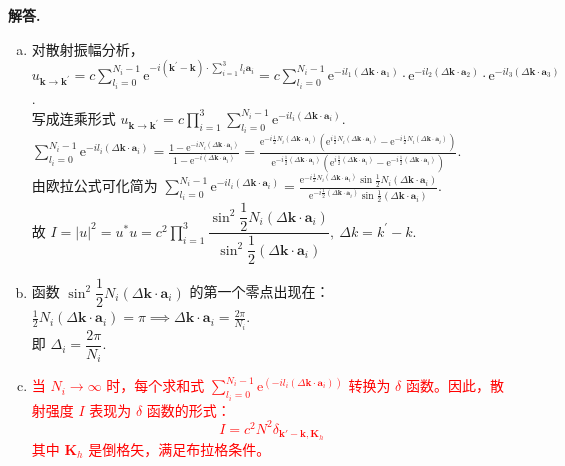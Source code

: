 \documentclass[11pt]{ctexart}
\newenvironment{solution}{\par\noindent\textbf{解答. }}{\par}
\begin{document}
\begin{solution}
    \begin{enumerate}[(a)]
        \item 对散射振幅分析，$\displaystyle u_{\mathbf{k}\to \mathbf{k}^\prime} = c\sum_{l_i = 0}^{N_i - 1}\text{e}^{-i\left(\mathbf{k}^\prime - \mathbf{k}\right)\cdot\sum\limits_{i = 1}^{3}l_i\mathbf{a}_i} 
              = c\sum_{l_i = 0}^{N_i - 1}\text{e}^{-il_1\left(\Delta\mathbf{k}\cdot\mathbf{a}_1\right)}\cdot\text{e}^{-il_2\left(\Delta\mathbf{k}\cdot\mathbf{a}_2\right)}\cdot\text{e}^{-il_3\left(\Delta\mathbf{k}\cdot\mathbf{a}_3\right)}$. \\[12pt]
              写成连乘形式 $\displaystyle u_{\mathbf{k}\to \mathbf{k}^\prime} = c\prod_{i = 1}^{3}\sum_{l_i = 0}^{N_i - 1}\text{e}^{-il_i\left(\Delta\mathbf{k}\cdot\mathbf{a}_i\right)}$. \\[12pt]
              $\displaystyle \sum_{l_i = 0}^{N_i - 1}\text{e}^{-il_i\left(\Delta\mathbf{k}\cdot\mathbf{a}_i\right)} = \frac{1 - \text{e}^{-i N_i \left(\Delta\mathbf{k} \cdot \mathbf{a}_i\right)}}{1 - \text{e}^{-i\left(\Delta\mathbf{k}\cdot\mathbf{a}_i\right)}}
              = \frac{\text{e}^{-i\frac{1}{2}N_i \left(\Delta\mathbf{k} \cdot \mathbf{a}_i\right)}\left(\text{e}^{i\frac{1}{2}N_i \left(\Delta\mathbf{k} \cdot \mathbf{a}_i\right)} - \text{e}^{-i\frac{1}{2}N_i \left(\Delta\mathbf{k} \cdot \mathbf{a}_i\right)}\right)}{\text{e}^{-i\frac{1}{2}\left(\Delta\mathbf{k} \cdot \mathbf{a}_i\right)}\left(\text{e}^{i\frac{1}{2}\left(\Delta\mathbf{k} \cdot \mathbf{a}_i\right)} - \text{e}^{-i\frac{1}{2}\left(\Delta\mathbf{k} \cdot \mathbf{a}_i\right)}\right)}$. \\[12pt]
              由欧拉公式可化简为 $\displaystyle \sum_{l_i = 0}^{N_i - 1}\text{e}^{-il_i\left(\Delta\mathbf{k}\cdot\mathbf{a}_i\right)} = \frac{\text{e}^{-i\frac{1}{2}N_i \left(\Delta\mathbf{k} \cdot \mathbf{a}_i\right)}\sin{\frac{1}{2}N_i \left(\Delta\mathbf{k} \cdot \mathbf{a}_i\right)}}{\text{e}^{-i\frac{1}{2} \left(\Delta\mathbf{k} \cdot \mathbf{a}_i\right)}\sin{\frac{1}{2} \left(\Delta\mathbf{k} \cdot \mathbf{a}_i\right)}}$. \\[12pt]
              故 $\displaystyle I = \left|u\right|^2 = u^*u = c^2\prod_{i = 1}^{3}\dfrac{\sin^2{\dfrac{1}{2}N_i\left(\Delta\mathbf{k}\cdot\mathbf{a}_i\right)}}{\sin^2{\dfrac{1}{2}\left(\Delta\mathbf{k}\cdot\mathbf{a}_i\right)}},\ \Delta k = k^\prime - k$.
        \item 函数 $\sin^2{\dfrac{1}{2}N_i\left(\Delta\mathbf{k}\cdot\mathbf{a}_i\right)}$ 的第一个零点出现在：$\displaystyle\frac{1}{2} N_i (\Delta \mathbf{k} \cdot \mathbf{a}_i) = \pi \implies \Delta \mathbf{k} \cdot \mathbf{a}_i = \frac{2\pi}{N_i}$. \\[12pt]
              即 $\Delta_i = \dfrac{2\pi}{N_i}$.
        \item \textcolor{red}{当 $N_i\to\infty$ 时，每个求和式 $\displaystyle\sum_{l_i=0}^{N_i-1}\text{e}^{\left(-i l_i(\Delta\mathbf{k}\cdot\mathbf{a}_i)\right)} $ 转换为 $\delta$ 函数。因此，散射强度 $I$ 表现为 $\delta$ 函数的形式：
              $$I = c^2 N^2 \delta_{\mathbf{k}' - \mathbf{k}, \mathbf{K}_h}$$
              其中 $\mathbf{K}_h$ 是倒格矢，满足布拉格条件。}
    \end{enumerate}
\end{solution}
\end{document}

